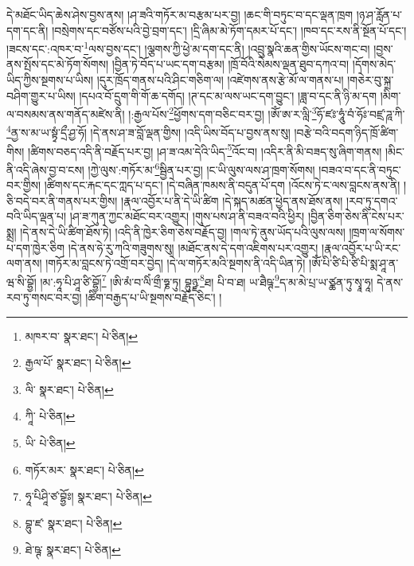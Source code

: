 དེ་མཐོང་ཡིད་ཆེས་ཤེས་བྱས་ནས། །ཤ་ཟའི་གཏོར་མ་བརྩམ་པར་བྱ། །ཆང་གི་བཏུང་བ་དང་ལྡན་ཁྲག །ཉ་ཤ་རློན་པ་དག་དང་ནི། །བསྲེགས་དང་བཙོས་པའི་བྱེ་བྲག་དང་། །དྲི་ཞིམ་མེ་ཏོག་དམར་པོ་དང་། །ཁབ་དང་རས་ནི་སྔོན་པོ་དང་། །ཟངས་དང་:འཁར་བ་\footnote{མཁར་བ་  སྣར་ཐང་།  པེ་ཅིན། }ལས་བྱས་དང་། །ལྕགས་ཀྱི་ཕྱེ་མ་དག་དང་ནི། །འབྲུ་སྣའི་ཆན་གྱིས་ཡོངས་གང་བ། །བྱས་ནས་སྤོས་དང་མེ་ཏོག་སོགས། །བྱིན་ཏེ་བོད་པ་ཡང་དག་བརྩམ། །ཁྲོ་བོའི་སེམས་ལྡན་ཐུབ་དཀའ་བ། །དོགས་མེད་ཡིད་ཀྱིས་སྔགས་པ་ཡིས། །དུར་ཁྲོད་གནས་པའི་ཤིང་གཅིག་ལ། །འཛེགས་ནས་རྩེ་མོ་ལ་གནས་པ། །གཅེར་བུ་སྐྲ་བཤིག་གྱུར་པ་ཡིས། །དཔའ་བོ་དྲུག་གི་གོ་ཆ་དགོད། །ཊ་དང་མ་ལས་ཡང་དག་བྱུང་། །ཟླ་བ་དང་ནི་ཉི་མ་དག །མིག་ལ་བསམས་ནས་གནོད་མཛེས་ནི། །:རྒྱལ་པོས་\footnote{རྒྱལ་པོ་  སྣར་ཐང་།  པེ་ཅིན། }ཕྱོགས་དག་བཅིང་བར་བྱ། །ཨོཾ་ཨ་ར་ལླི་\footnote{ལི་  སྣར་ཐང་།  པེ་ཅིན། }ཧོ་ཛཿ་ཧཱུཾ་བཾ་ཧོཿ་བཛྲ་ཌཱ་ཀི་\footnote{ཀཱི་  པེ་ཅིན། }ནྱ་ས་མ་ཡ་སྟྭཾ་དྲྀ་ཤྱ་ཧོ། །དེ་ནས་ཤ་ཟ་བློ་ལྡན་གྱིས། །འདི་ཡིས་བོད་པ་བྱས་ནས་སུ། །བརྩེ་བའི་བདག་ཉིད་ཁྲོ་ཚིག་གིས། །ཚིགས་བཅད་འདི་ནི་བརྗོད་པར་བྱ། །ཤ་ཟ་འམ་དེའི་ཡིད་\footnote{ཡི་  པེ་ཅིན། }འོང་བ། །འདིར་ནི་མི་བཟད་སུ་ཞིག་གནས། །མིང་ནི་འདི་ཞེས་བྱ་བ་ངས། །ཀྱེ་ལུས་:གཏོར་མ་\footnote{གཏོར་མར་  སྣར་ཐང་།  པེ་ཅིན། }སྦྱིན་པར་བྱ། །ང་ཡི་ལུས་ལས་ཤ་ཁྲག་སོགས། །བཟའ་བ་དང་ནི་བཏུང་བར་གྱིས། །ཚིགས་དང་རྐང་དང་ཀླད་པ་དང་། །དེ་བཞིན་ཁམས་ནི་བདུན་པོ་དག །འོངས་ཏེ་ང་ལས་བླངས་ནས་ནི། །ཅི་བདེ་བར་ནི་གནས་པར་གྱིས། །རྣལ་འབྱོར་པ་ནི་དེ་ཡི་ཚིག །དེ་སྐད་མཚན་ཕྱེད་ནས་ཐོས་ནས། །རབ་ཏུ་དགའ་བའི་ཡིད་ལྡན་པ། །ཤ་ཟ་ཀུན་ཀྱང་མཐོང་བར་འགྱུར། །གུས་པས་ཤ་ནི་བཟའ་བའི་ཕྱིར། །བྱིན་ཅིག་ཅེས་ནི་ངེས་པར་སྨྲ། །དེ་ནས་དེ་ཡི་ཚིག་ཐོས་ཏེ། །འདི་ནི་ཁྱེར་ཅིག་ཅེས་བརྗོད་བྱ། །གལ་ཏེ་ནུས་ཡོད་པའི་ལུས་ལས། །ཁྲག་ལ་སོགས་པ་དག་ཁྱེར་ཅིག །དེ་ནས་ཧེ་རུ་ཀའི་གཟུགས་སུ། །མཐོང་ནས་དེ་དག་འཇིགས་པར་འགྱུར། །རྣལ་འབྱོར་པ་ཡི་རང་ལག་ནས། །གཏོར་མ་བླངས་ཏེ་འགྲོ་བར་བྱེད། །དེ་ལ་གཏོར་མའི་སྔགས་ནི་འདི་ཡིན་ཏེ། །ཨོཾ་པི་ཙི་པི་ཙི་པི་སྨ་ཤཱ་ན་ཝ་སི་བྷྱོ། །མ་:ཧཱ་པི་ཤཱ་ཙི་བྷྱོ།\footnote{ཧཱ་པིཤཱི་ཙ་བྷྱོཿ།  སྣར་ཐང་།  པེ་ཅིན། } །ཨི་མཾ་བ་ལིཾ་གྲྀ་ཧྞ་ཏུ། བྷུཉྫ་\footnote{བྷུ་ཛ་  སྣར་ཐང་།  པེ་ཅིན། }ཐ། པི་བ་ཐ། ཡ་ཐཻཥྚ་\footnote{ཐེ་ཥྚ་  སྣར་ཐང་།  པེ་ཅིན། }ད་མ་མེ་པྲ་ཡ་ཙྪན་ཏུ་སྭཱ་ཧཱ། དེ་ནས་རབ་ཏུ་གསང་བར་བྱ། །ཚིག་བརྒྱད་པ་ཡི་སྔགས་བརྗོད་ཅིང་། །
